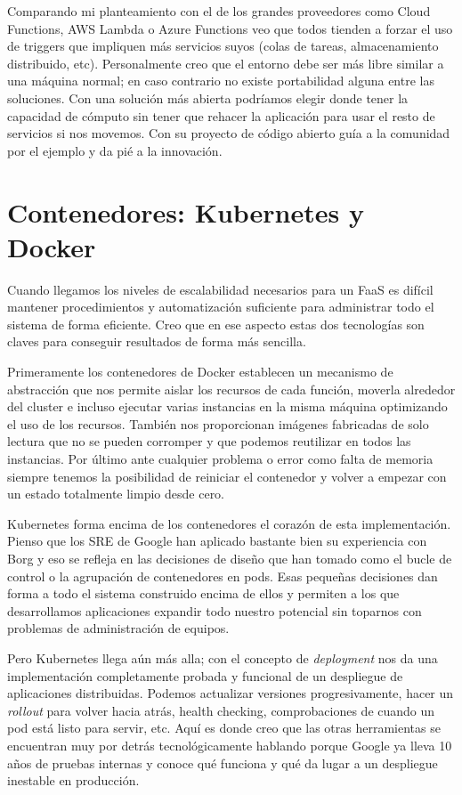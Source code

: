 Comparando mi planteamiento con el de los grandes proveedores como Cloud Functions, AWS Lambda o Azure Functions veo que todos tienden a forzar el uso de triggers que impliquen más servicios suyos (colas de tareas, almacenamiento distribuido, etc). Personalmente creo que el entorno debe ser más libre similar a una máquina normal; en caso contrario no existe portabilidad alguna entre las soluciones. Con una solución más abierta podríamos elegir donde tener la capacidad de cómputo sin tener que rehacer la aplicación para usar el resto de servicios si nos movemos. Con su proyecto de código abierto guía a la comunidad por el ejemplo y da pié a la innovación.

\section{Contenedores: Kubernetes y Docker}

Cuando llegamos los niveles de escalabilidad necesarios para un FaaS es difícil mantener procedimientos y automatización suficiente para administrar todo el sistema de forma eficiente. Creo que en ese aspecto estas dos tecnologías son claves para conseguir resultados de forma más sencilla.

Primeramente los contenedores de Docker establecen un mecanismo de abstracción que nos permite aislar los recursos de cada función, moverla alrededor del cluster e incluso ejecutar varias instancias en la misma máquina optimizando el uso de los recursos. También nos proporcionan imágenes fabricadas de solo lectura que no se pueden corromper y que podemos reutilizar en todos las instancias. Por último ante cualquier problema o error como falta de memoria siempre tenemos la posibilidad de reiniciar el contenedor y volver a empezar con un estado totalmente limpio desde cero.

Kubernetes forma encima de los contenedores el corazón de esta implementación. Pienso que los SRE de Google han aplicado bastante bien su experiencia con Borg\cite{k8sborg} y eso se refleja en las decisiones de diseño que han tomado como el bucle de control o la agrupación de contenedores en pods. Esas pequeñas decisiones dan forma a todo el sistema construido encima de ellos y permiten a los que desarrollamos aplicaciones expandir todo nuestro potencial sin toparnos con problemas de administración de equipos.

Pero Kubernetes llega aún más alla; con el concepto de \emph{deployment} nos da una implementación completamente probada y funcional de un despliegue de aplicaciones distribuidas. Podemos actualizar versiones progresivamente, hacer un \emph{rollout} para volver hacia atrás, health checking, comprobaciones de cuando un pod está listo para servir, etc. Aquí es donde creo que las otras herramientas se encuentran muy por detrás tecnológicamente hablando porque Google ya lleva 10 años de pruebas internas y conoce qué funciona y qué da lugar a un despliegue inestable en producción.

